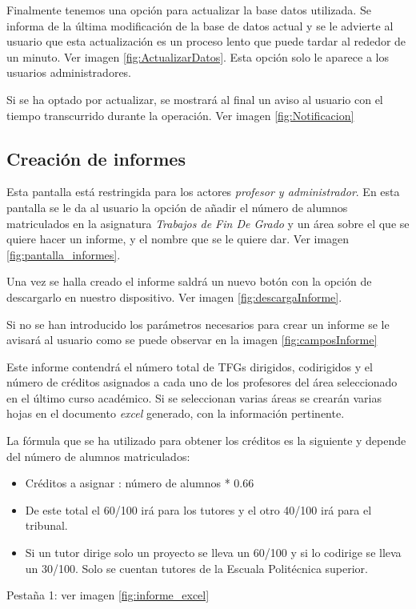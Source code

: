Finalmente tenemos una opción para actualizar la base datos utilizada. Se informa de la última modificación de la base de datos actual y se le advierte al usuario que esta actualización es un proceso lento que puede tardar al rededor de un minuto. Ver imagen \ref{fig:ActualizarDatos}. Esta opción solo le aparece a los usuarios administradores.


Si se ha optado por actualizar, se mostrará al final un aviso al usuario con el tiempo transcurrido durante la operación. Ver imagen \ref{fig:Notificacion}

\subsection{Creación de informes}
Esta pantalla está restringida para los actores \emph{profesor y administrador}.
En esta pantalla se le da al usuario la opción de añadir el número de alumnos matriculados en la asignatura \emph{Trabajos de Fin De Grado} y un área sobre el que se quiere hacer un informe, y el nombre que se le quiere dar. 
Ver imagen \ref{fig:pantalla_informes}.


Una vez se halla creado el informe saldrá un nuevo botón con la opción de descargarlo en nuestro dispositivo. Ver imagen \ref{fig:descargaInforme}.


Si no se han introducido los parámetros necesarios para crear un informe se le avisará al usuario como se puede observar en la imagen \ref{fig:camposInforme}


Este informe contendrá el número total de TFGs dirigidos, codirigidos y el número de créditos asignados a cada uno de los profesores del área seleccionado en el último curso académico. Si se seleccionan varias áreas se crearán varias hojas en el documento \emph{excel} generado, con la información pertinente. 

La fórmula que se ha utilizado para obtener los créditos es la siguiente y depende del número de alumnos matriculados:
\begin{itemize}
	\item Créditos a asignar : número de alumnos * 0.66
	\item De este total el 60/100 irá para los tutores y el otro 40/100 irá para el tribunal.
	\item Si un tutor dirige solo un proyecto se lleva un 60/100 y si lo codirige se lleva un 30/100. Solo se cuentan tutores de la Escuala Politécnica superior.
\end{itemize}
Pestaña 1: ver imagen \ref{fig:informe_excel}


